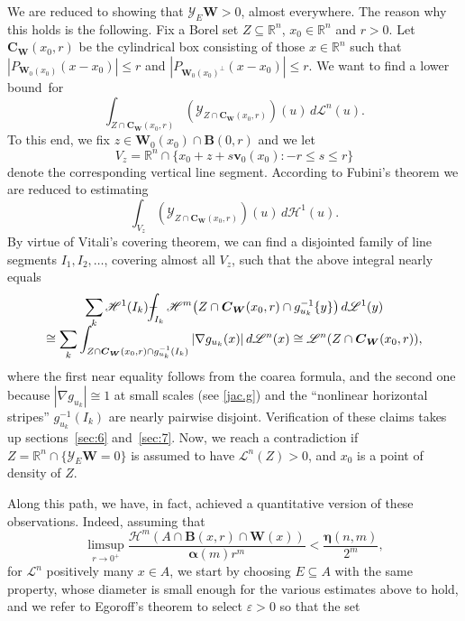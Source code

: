 \documentclass[JEP,XML,SOM,Unicode,ThmDefs,NoEqCountersInSection]{cedram}
\newcommand{\R}{\mathbb{R}}
\newcommand{\Rn}{\R^n}
\newcommand{\calH}{\mathscr{H}}
\newcommand{\calL}{\mathscr{L}}
\newcommand{\calY}{\mathscr{Y}}
\newcommand{\balpha}{\boldsymbol{\alpha}}
\newcommand{\boldeta}{\boldsymbol{\eta}}
\newcommand{\bB}{{\boldsymbol{B}}}
\newcommand{\bC}{{\boldsymbol{C}}}
\newcommand{\bW}{{\boldsymbol{W}}}
\newcommand{\bv}{{\boldsymbol{v}}}
\def\Xint#1{\mathchoice
{\XXint\displaystyle\textstyle{#1}}{\XXint\textstyle\scriptstyle{#1}}{\XXint\scriptstyle\scriptscriptstyle{#1}}{\XXint\scriptscriptstyle
\scriptscriptstyle{#1}}\!\int}
\def\XXint#1#2#3{{\setbox0=\hbox{$#1{#2#3}{\int}$}
\vcenter{\hbox{$#2#3$}}\kern-.5\wd0}}
\def\dashint{\Xint-}
\let\veps\varepsilon
\let\subset\subseteq
\begin{document}
We are reduced to showing that $\calY_E \bW > 0$, almost everywhere.
The reason why this holds is the following.
Fix a Borel set $Z \subset \Rn$, $x_0 \in \Rn$ and $r > 0$.
Let $\bC_\bW(x_0,r)$ be the cylindrical box consisting of those $x \in \Rn$ such that $\left|P_{\bW_0(x_0)}(x-x_0) \right| \leq r$ and $\left|P_{\bW_0(x_0)^\perp}(x-x_0) \right| \leq r$.
We want to find a lower bound~for
\begin{equation*}
\int_{Z \cap \bC_\bW(x_0,r)} \left(\calY_{Z \cap \bC_\bW(x_0,r)}\right)(u) \,d\calL^n(u).
\end{equation*}
To this end, we fix $z \in \bW_0(x_0) \cap \bB(0,r)$ and we let
\[
V_z = \Rn \cap \{ x_0 + z + s\bv_0(x_0): -r \leq s \leq r \}
\]
denote the corresponding vertical line segment.
According to Fubini's theorem we are reduced to estimating
\begin{equation*}
\int_{V_z} \left(\calY_{Z \cap \bC_\bW(x_0,r)}\right)(u) \,d\calH^1(u).
\end{equation*}
By virtue of Vitali's covering theorem, we can find a disjointed family of line segments $I_1,I_2,\ldots$, covering almost all $V_z$, such that the above integral nearly equals
\begin{multline*}
\sum_k \calH^1(I_k) \dashint_{I_k} \calH^m \bigl(Z \cap \bC_\bW(x_0,r) \cap g_{u_k}^{-1} \{y\}\bigr) \,d\calL^1(y) \\[-5pt]
\cong \sum_k \int_{ Z \cap \bC_\bW(x_0,r) \cap g_{u_k}^{-1} (I_k)} | \nabla g_{u_k}(x)| \,d\calL^n(x) \cong \calL^n(Z \cap \bC_\bW(x_0,r)),
\end{multline*}
where the first near equality follows from the coarea formula, and the second one because $\left| \nabla g_{u_k} \right| \cong 1$ at small scales (see \ref{jac.g}) and the ``nonlinear horizontal stripes'' $g_{u_k}^{-1} (I_k)$ are nearly pairwise disjoint.
Verification of these claims takes up sections~\ref{sec:6} and~\ref{sec:7}.
Now, we reach a contradiction if $Z = \Rn \cap \{ \calY_E \bW = 0\}$ is assumed to have $\calL^n(Z) > 0$, and $x_0$ is a point of density of $Z$.
\par
Along this path, we have, in fact, achieved a quantitative version of these observations.
Indeed, assuming that
\[
\limsup_{r \to 0^+} \frac{\calH^m (A \cap \bB(x,r) \cap \bW(x))}{\balpha(m)r^m} < \frac{\boldeta(n,m)}{2^m},
\]
for $\calL^n$ positively many $x \in A$, we start by choosing $E \subset A$ with the same property, whose diameter is small enough for the various estimates above to hold, and we refer to Egoroff's theorem to select $\veps > 0$ so that the set
\end{document}
